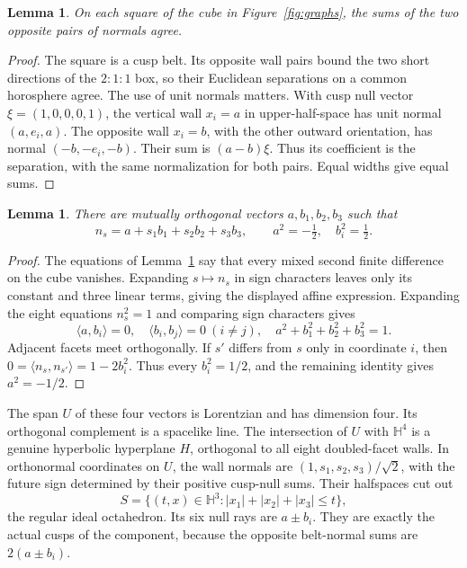 \documentclass[11pt]{article}
\newtheorem{lemma}[theorem]{Lemma}
\theoremstyle{remark}
\newcommand{\HH}{\mathbb H}
\newcommand{\ip}[2]{\langle #1,#2\rangle}
\begin{document}
\begin{lemma}\label{lem:width}
On each square of the cube in Figure~\ref{fig:graphs}, the sums of
the two opposite pairs of normals agree.
\end{lemma}
\begin{proof}
The square is a cusp belt. Its opposite wall pairs bound the two
short directions of the $2:1:1$ box, so their Euclidean separations
on a common horosphere agree. The use of unit normals matters.
With cusp null vector $\xi=(1,0,0,0,1)$, the vertical wall $x_i=a$
in upper-half-space has unit normal $(a,e_i,a)$. The opposite wall
$x_i=b$, with the other outward orientation, has normal
$(-b,-e_i,-b)$. Their sum is $(a-b)\xi$. Thus its coefficient is
the separation, with the same normalization for both pairs. Equal
widths give equal sums.
\end{proof}

\begin{lemma}\label{lem:normal}
There are mutually orthogonal vectors $a,b_1,b_2,b_3$ such that
\[
 n_s=a+s_1b_1+s_2b_2+s_3b_3,\qquad
 a^2=-\tfrac12,\quad b_i^2=\tfrac12.
\]
\end{lemma}
\begin{proof}
The equations of Lemma~\ref{lem:width} say that every mixed second
finite difference on the cube vanishes. Expanding $s\mapsto n_s$
in sign characters leaves only its constant and three linear
terms, giving the displayed affine expression. Expanding the
eight equations $n_s^2=1$ and comparing sign characters gives
\[
 \ip{a}{b_i}=0,\quad \ip{b_i}{b_j}=0\ (i\ne j),\quad
 a^2+b_1^2+b_2^2+b_3^2=1.
\]
Adjacent facets meet orthogonally. If $s'$ differs from $s$ only
in coordinate $i$, then
$0=\ip{n_s}{n_{s'}}=1-2b_i^2$. Thus every $b_i^2=1/2$, and
the remaining identity gives $a^2=-1/2$.
\end{proof}

The span $U$ of these four vectors is Lorentzian and has dimension
four. Its orthogonal complement is a spacelike line. The
intersection of $U$ with $\HH^4$ is a genuine hyperbolic
hyperplane $H$, orthogonal to all eight doubled-facet walls.
In orthonormal coordinates on $U$, the wall normals are
$(1,s_1,s_2,s_3)/\sqrt2$, with the future sign determined by their
positive cusp-null sums. Their halfspaces cut out
\begin{equation}\label{eq:section}
 S=\{(t,x)\in\HH^3:|x_1|+|x_2|+|x_3|\le t\},
\end{equation}
the regular ideal octahedron. Its six null rays are $a\pm b_i$.
They are exactly the actual cusps of the component, because the
opposite belt-normal sums are $2(a\pm b_i)$.
\end{document}
